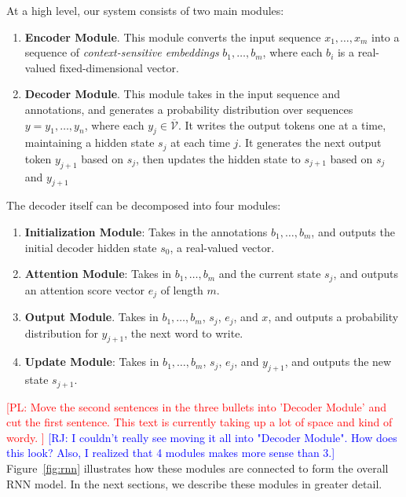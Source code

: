 \documentclass[11pt,letterpaper]{article}
\newcommand{\vocabout}{\overline{\mathcal{V}}}
\newcommand\pl[1]{\textcolor{red}{[PL: #1]}}
\newcommand\rj[1]{\textcolor{blue}{[RJ: #1]}}
\begin{document}
At a high level, our system consists of two main modules:
\begin{enumerate}
  \item \textbf{Encoder Module}.  This module 
    converts the input sequence $x_1, \dotsc, x_m$
    into a sequence of \emph{context-sensitive embeddings}
    $b_1, \dotsc, b_m$,
    where each $b_i$ is a real-valued fixed-dimensional vector.
  \item \textbf{Decoder Module}.  This module
    takes in the input sequence and annotations,
    and generates a probability distribution
    over sequences $y = y_1, \dotsc, y_n$,
    where each $y_j \in \vocabout$.
    It writes the output tokens one at a time,
    maintaining a hidden state $s_j$ at each time $j$.
    It generates the next output token $y_{j+1}$ based on $s_j$,
    then updates the hidden state to $s_{j+1}$ based on
    $s_j$ and $y_{j+1}$
\end{enumerate}
The decoder itself can be decomposed into four modules:
\begin{enumerate}
  \item \textbf{Initialization Module}:
    Takes in the annotations $b_1, \dotsc, b_m$, and
    outputs the initial decoder hidden state $s_0$,
    a real-valued vector.
  \item \textbf{Attention Module}:
    Takes in $b_1, \dotsc, b_m$ and the current state $s_j$,
    and outputs an attention score vector $e_j$ of length $m$.
  \item \textbf{Output Module}.  
    Takes in $b_1, \dotsc, b_m$, $s_j$, $e_j$, and $x$,
    and outputs a probability distribution 
    for $y_{j+1}$, the next word to write.
  \item \textbf{Update Module}: 
    Takes in $b_1, \dotsc, b_m$, $s_j$, $e_j$, and $y_{j+1}$,
    and outputs the new state $s_{j+1}$.
\end{enumerate}
\pl{Move the second sentences in the three bullets into 'Decoder Module'
  and cut the first sentence.
  This text is currently taking up a lot of space and kind of wordy.
}
\rj{I couldn't really see moving it all into "Decoder Module".  How does this look?
Also, I realized that 4 modules makes more sense than 3.}
Figure~\ref{fig:rnn} illustrates how these modules are connected
to form the overall RNN model.
In the next sections, we describe these modules in greater detail.

\end{document}
